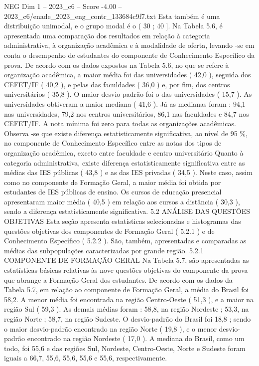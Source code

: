 \begin{textsample}{NEG Dim 1 – 2023\_c6 – Score -4.00 – 2023\_c6/enade\_2023\_eng\_contr\_133684c9f7.txt}
Esta também é uma distribuição unimodal, e o grupo modal é o ( 30 ; 40 ].
Na Tabela 5.6, é apresentada uma comparação dos resultados em relação à categoria administrativa, à organização acadêmica e à modalidade de oferta, levando -se em conta o desempenho de estudantes do componente de Conhecimento Específico da prova.
De acordo com os dados expostos na Tabela 5.6, no que se refere à organização acadêmica, a maior média foi das universidades ( 42,0 ), seguida dos CEFET/IF ( 40,2 ), e pelas das faculdades ( 36,0 ) e, por fim, dos centros universitários ( 35,8 ).
O maior desvio-padrão foi o das universidades ( 15,7 ).
As universidades obtiveram a maior mediana ( 41,6 ).
Já as medianas foram : 94,1 nas universidades, 79,2 nos centros universitários, 86,1 nas faculdades e 84,7 nos CEFET/IF.
A nota mínima foi zero para todas as organizações acadêmicas.
Observa -se que existe diferença estatisticamente significativa, ao nível de 95 \%, no componente de Conhecimento Específico entre as notas dos tipos de organização acadêmica, exceto entre faculdade e centro universitário Quanto à categoria administrativa, existe diferença estatisticamente significativa entre as médias das IES públicas ( 43,8 ) e as das IES privadas ( 34,5 ).
Neste caso, assim como no componente de Formação Geral, a maior média foi obtida por estudantes de IES públicas de ensino.
Os cursos de educação presencial apresentaram maior média ( 40,5 ) em relação aos cursos a distância ( 30,3 ), sendo a diferença estatisticamente significativa. 5.2 ANÁLISE DAS QUESTÕES OBJETIVAS Esta seção apresenta estatísticas selecionadas e histogramas das questões objetivas dos componentes de Formação Geral ( 5.2.1 ) e de Conhecimento Específico ( 5.2.2 ).
São, também, apresentadas e comparadas as médias das subpopulações caracterizadas por grande região. 5.2.1 COMPONENTE DE FORMAÇÃO GERAL Na Tabela 5.7, são apresentadas as estatísticas básicas relativas às nove questões objetivas do componente da prova que abrange a Formação Geral dos estudantes.
De acordo com os dados da Tabela 5.7, em relação ao componente de Formação Geral, a média do Brasil foi 58,2.
A menor média foi encontrada na região Centro-Oeste ( 51,3 ), e a maior na região Sul ( 59,3 ).
As demais médias foram : 58,8, na região Nordeste ; 53,3, na região Norte ; 58,7, na região Sudeste.
O desvio-padrão do Brasil foi 18,8 ; sendo o maior desvio-padrão encontrado na região Norte ( 19,8 ), e o menor desvio-padrão encontrado na região Nordeste ( 17,0 ).
A mediana do Brasil, como um todo, foi 55,6 e das regiões Sul, Nordeste, Centro-Oeste, Norte e Sudeste foram iguais a 66,7, 55,6, 55,6, 55,6 e 55,6, respectivamente.

\end{textsample}
